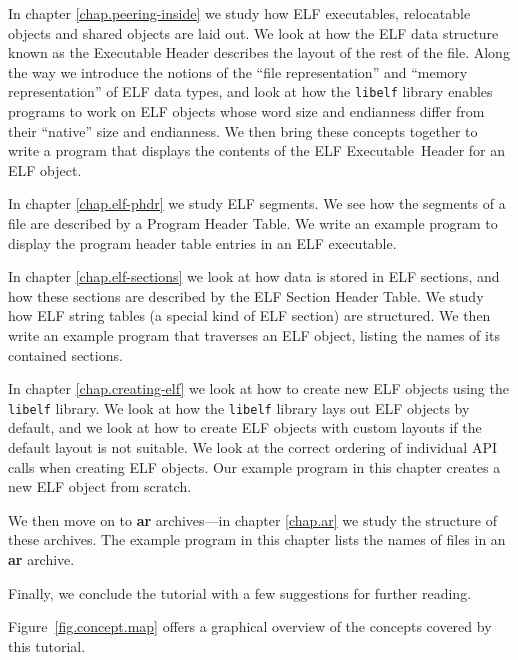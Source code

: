 \documentclass[a4paper,pdftex]{book}
\newcommand{\library}[1]{\texttt{#1}}
\newcommand{\tool}[1]{\textbf{#1}}
\newcommand{\elfdatastructure}[1]{\textsf{#1}}
\begin{document}
In chapter \vref{chap.peering-inside} we study how ELF executables,
relocatable objects and shared objects are laid out. We look at how
the ELF data structure known as the \elfdatastructure{Executable
  Header} describes the layout of the rest of
the file.  Along the way we introduce the notions of the ``file
representation'' and ``memory
representation'' of ELF data types, and
look at how the \library{libelf} library enables programs to work
on ELF objects whose word size and endianness differ from their
``native'' size and endianness. We then bring these concepts together
to write a program that displays the contents of the ELF
\elfdatastructure{Executable~Header} for an
ELF object.

In chapter \vref{chap.elf-phdr} we study ELF segments. We see how the
segments of a file are described by a \elfdatastructure{Prog\-ram
  Head\-er Table}. We write an example
program to display the program header table entries in an ELF
executable.

In chapter \vref{chap.elf-sections} we look at how data is stored in
ELF sections, and how these sections are described by the ELF
\elfdatastructure{Section Header Table}.
We study how ELF string tables (a special kind of ELF section) are
structured. We then write an example program that traverses an ELF
object, listing the names of its contained sections.

In chapter \vref{chap.creating-elf} we look at how to create new ELF
objects using the \library{libelf} library. We look at how the
\library{libelf} library lays out ELF objects by default, and we look
at how to create ELF objects with custom layouts if the default layout
is not suitable. We look at the correct ordering of individual API
calls when creating ELF objects. Our example program in this chapter
creates a new ELF object from scratch.

We then move on to \tool{ar} archives---in chapter \vref{chap.ar} we
study the structure of these archives. The example program in this
chapter lists the names of files in an \tool{ar} archive.

Finally, we conclude the tutorial with a few suggestions for further
reading.

Figure~\vref{fig.concept.map} offers a graphical overview of the
concepts covered by this tutorial.
\end{document}
